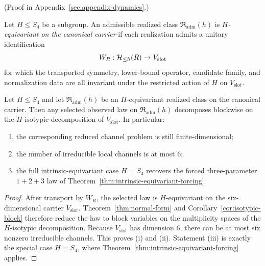 (Proof in Appendix~\ref{sec:appendix-dynamics}.)

\begin{definition}
\label{def:subgroup-broken-realized-class}
Let $H\le S_4$ be a subgroup. An admissible realized class
$\mathfrak R_{\mathrm{adm}}(h)$ is \emph{$H$-equivariant on the canonical
carrier} if each realization admits a unitary identification
\[
W_R:\mathcal{H}_{\le h}(R)\to V_{\mathrm{slot}}
\]
for which the transported symmetry, lower-bound operator, candidate family, and
normalization data are all invariant under the restricted action of $H$ on
$V_{\mathrm{slot}}$.
\end{definition}

\begin{proposition}
\label{prop:finite-subgroup-broken-selection}
Let $H\le S_4$ and let $\mathfrak R_{\mathrm{adm}}(h)$ be an
$H$-equivariant realized class on the canonical carrier. Then any selected
observed law on $\mathfrak R_{\mathrm{adm}}(h)$ decomposes blockwise on the
$H$-isotypic decomposition of $V_{\mathrm{slot}}$. In particular:
\begin{enumerate}[label=(\roman*), leftmargin=2em, itemsep=0.2em]
\item the corresponding reduced channel problem is still finite-dimensional;
\item the number of irreducible local channels is at most $6$;
\item the full intrinsic-equivariant case $H=S_4$ recovers the forced
      three-parameter $1+2+3$ law of
      Theorem~\ref{thm:intrinsic-equivariant-forcing}.
\end{enumerate}
\end{proposition}

\begin{proof}
After transport by $W_R$, the selected law is $H$-equivariant on the
six-dimensional carrier $V_{\mathrm{slot}}$. Theorem~\ref{thm:normal-form} and
Corollary~\ref{cor:isotypic-block} therefore reduce the law to block variables
on the multiplicity spaces of the $H$-isotypic decomposition. Because
$V_{\mathrm{slot}}$ has dimension $6$, there can be at most six nonzero
irreducible channels. This proves (i) and (ii). Statement (iii) is exactly the
special case $H=S_4$, where
Theorem~\ref{thm:intrinsic-equivariant-forcing} applies.
\end{proof}

